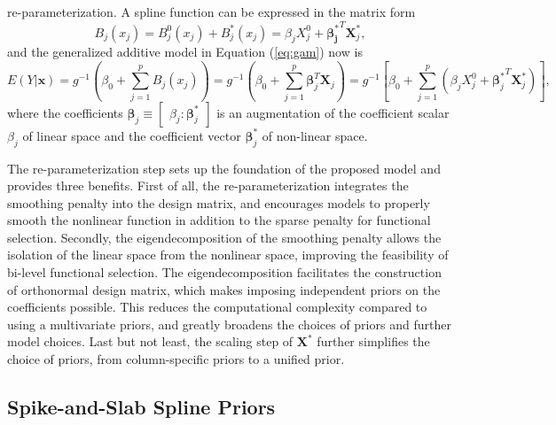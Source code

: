 \documentclass[AMA,STIX1COL,]{WileyNJD-v2}
\begin{document}
re-parameterization. A spline function can be expressed in the matrix
form \[
B_j(x_j) = B_j^0(x_j) + B_j^*(x_j) = \beta_j X^0_j + \boldsymbol{\beta_j^*}^T \boldsymbol{X}_j^*,
\] and the generalized additive model in Equation (\ref{eq:gam}) now is
\begin{equation}\label{eq:gam-repa}
E(Y|\boldsymbol{x}) = g^{-1}(\beta_0 + \sum\limits^p_{j=1} B_j(x_j)) = g^{-1}(\beta_0 + \sum\limits^p_{j=1} \boldsymbol{\beta}_j^T \boldsymbol{X}_j) = g^{-1}\left[\beta_0 + \sum\limits^p_{j=1} (\beta_j X^0_j + {\boldsymbol{\beta}_j^*}^T \boldsymbol{X}_j^*)\right],
\end{equation} where the coefficients
\(\boldsymbol{\beta}_j \equiv \begin{bmatrix} \beta_j : \boldsymbol{\beta}^*_j \end{bmatrix}\)
is an augmentation of the coefficient scalar \(\beta_j\) of linear space
and the coefficient vector \(\boldsymbol{\beta}^*_j\) of non-linear
space.

The re-parameterization step sets up the foundation of the proposed
model and provides three benefits. First of all, the re-parameterization
integrates the smoothing penalty into the design matrix, and encourages
models to properly smooth the nonlinear function in addition to the
sparse penalty for functional selection. Secondly, the
eigendecomposition of the smoothing penalty allows the isolation of the
linear space from the nonlinear space, improving the feasibility of
bi-level functional selection. The eigendecomposition facilitates the
construction of orthonormal design matrix, which makes imposing
independent priors on the coefficients possible. This reduces the
computational complexity compared to using a multivariate priors, and
greatly broadens the choices of priors and further model choices. Last
but not least, the scaling step of \(\boldsymbol{X}^*\) further
simplifies the choice of priors, from column-specific priors to a
unified prior.

\hypertarget{spike-and-slab-spline-priors}{%
\subsection{Spike-and-Slab Spline
Priors}\label{spike-and-slab-spline-priors}}
\end{document}
